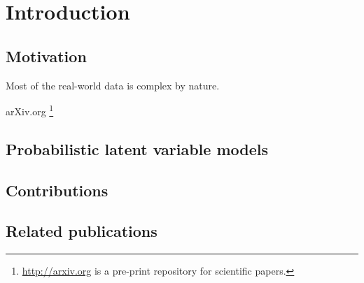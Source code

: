 
\chapter{Introduction}\label{chpt:intro}

\section{Motivation}\label{chpt:intro:sec:motivation}

Most of the real-world data is complex by nature. 

\PP 

\PP arXiv.org \footnote{\url{http://arxiv.org} is a pre-print repository
  for scientific papers.} 

\section{Probabilistic latent variable models}\label{chpt:intro:sec:model}

\section{Contributions}\label{chpt:intro:sec:contribution}

\section{Related publications}

